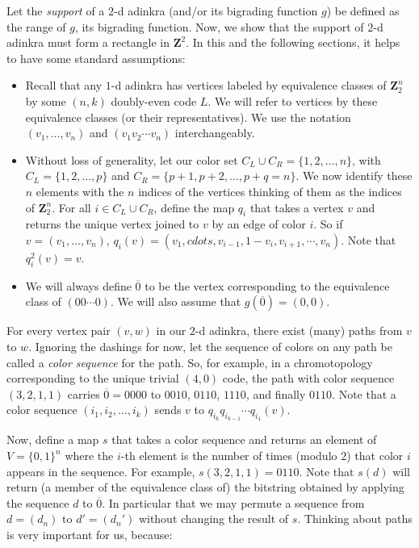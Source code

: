 \documentclass[12pt,twoside,singlespace]{article}
\numberwithin{equation}{section}
\theoremstyle{definition}
\newcommand{\ZZ}{\mathbf{Z}}
\begin{document}
Let the \emph{support} of a $2$-d adinkra (and/or its bigrading function $g$) be defined as the range of $g$, its bigrading function. Now, we show that the support of $2$-d adinkra must form a rectangle in $\ZZ^2$. In this and the following sections, it helps to have some standard assumptions:

\begin{itemize}
\item Recall that any $1$-d adinkra has vertices labeled by equivalence classes of $\ZZ_2^n$ by some $(n,k)$ doubly-even code $L$. We will refer to vertices by these equivalence classes (or their representatives). We use the notation $(v_1, \ldots, v_n)$ and $(v_1 v_2 \cdots v_n)$ interchangeably.
\item Without loss of generality, let our color set $C_L \cup C_R = \{1,2,\ldots, n\}$, with $C_L = \{1, 2, \ldots, p\}$ and $C_R = \{p+1, p+2, \ldots, p+q=n\}$. We now identify these $n$ elements with the $n$ indices of the vertices thinking of them as the indices of $\ZZ_2^n$. For all $i \in C_L \cup C_R$, define the map $q_i$ that takes a vertex $v$ and returns the unique vertex joined to $v$ by an edge of color $i$. So if $v = (v_1, \ldots, v_n)$, $q_i(v) = (v_1, cdots, v_{i-1}, 1-v_i, v_{i+1}, \cdots, v_n)$. Note that $q_i^2(v) = v$.
\item We will always define $\overline{0}$ to be the vertex corresponding to the equivalence class of $(00\cdots0)$. We will also assume that $g(\overline{0}) = (0,0)$. 
\end{itemize}

For every vertex pair $(v,w)$ in our $2$-d adinkra, there exist (many) paths from $v$ to $w$. Ignoring the dashings for now, let the sequence of colors on any path be called a \emph{color sequence} for the path. So, for example, in a chromotopology corresponding to the unique trivial $(4,0)$ code, the path with color sequence $(3,2,1,1)$ carries $\overline{0} = 0000$ to $0010$, $0110$, $1110$, and finally $0110$. Note that a color sequence $(i_1, i_2, \ldots, i_k)$ sends $v$ to $q_{i_k} q_{i_{k-1}} \cdots q_{i_1} (v)$.

Now, define a map $s$ that takes a color sequence and returns an element of $V = \{0,1\}^n$ where the $i$-th element is the number of times (modulo $2$) that color $i$ appears in the sequence. For example, $s(3,2,1,1) = 0110$. Note that $s(d)$ will return (a member of the equivalence class of) the bitstring obtained by applying the sequence $d$ to $\overline{0}$.  In particular that we may permute a sequence from $d = (d_n)$ to $d' = (d_n')$ without changing the result of $s$. Thinking about paths is very important for us, because:
\end{document}
